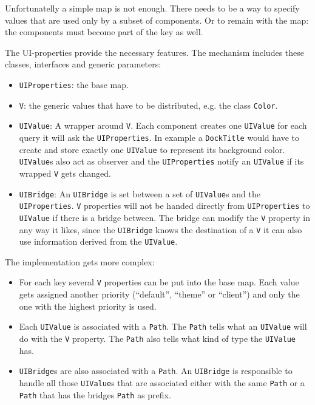 \documentclass[a4paper,10pt]{article}
\newcommand{\src}[1]{\texttt{#1}}
\begin{document}
Unfortunatelly a simple map is not enough. There needs to be a way to specify values that are used only by a subset of components. Or to remain with the map: the components must become part of the key as well.

The UI-properties provide the necessary features. The mechanism includes these classes, interfaces and generic parameters:
\begin{itemize}
	\item \src{UIProperties}: the base map.
	\item \src{V}: the generic values that have to be distributed, e.g. the class \src{Color}.
	\item \src{UIValue}: A wrapper around \src{V}. Each component creates one \src{UIValue} for each query it will ask the \src{UIProperties}. In example a \src{DockTitle} would have to create and store exactly one \src{UIValue} to represent its background color. \src{UIValue}s also act as observer and the \src{UIProperties} notify an \src{UIValue} if its wrapped \src{V} gets changed.
	\item \src{UIBridge}: An \src{UIBridge} is set between a set of \src{UIValue}s and the \linebreak \src{UIProperties}. \src{V} properties will not be handed directly from \linebreak \src{UIProperties} to \src{UIValue} if there is a bridge between. The bridge can modify the \src{V} property in any way it likes, since the \src{UIBridge} knows the destination of a \src{V} it can also use information derived from the \src{UIValue}.
\end{itemize}

The implementation gets more complex:
\begin{itemize}
	\item For each key several \src{V} properties can be put into the base map. Each value gets assigned another priority (``default'', ``theme'' or ``client'') and only the one with the highest priority is used.
	\item Each \src{UIValue} is associated with a \src{Path}. The \src{Path} tells what an \src{UIValue} will do with the \src{V} property. The \src{Path} also tells what kind of type the \src{UIValue} has.
	\item \src{UIBridge}s are also associated with a \src{Path}. An \src{UIBridge} is responsible to handle all those \src{UIValue}s that are associated either with the same \src{Path} or a \src{Path} that has the bridges \src{Path} as prefix.
\end{itemize}
\end{document}
